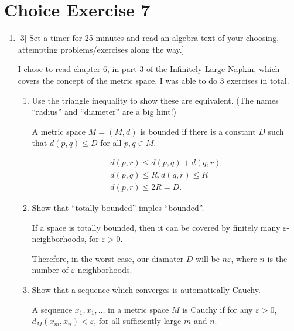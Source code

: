 \documentclass{article}
\begin{document}
\section*{Choice Exercise 7}
\begin{enumerate}
    \item {
        [3] Set a timer for 25 minutes and read an algebra text of your choosing, attempting problems/exercises along the way.]

        I chose to read chapter 6, in part 3 of the Infinitely Large Napkin, which
        covers the concept of the metric space. I was able to do 3 exercises 
        in total. 

        \begin{enumerate}
            \item[Exercise 6.1.3. ] {
                Use the triangle inequality to show these are equivalent. (The names “radius” and “diameter” are a big hint!)

                A metric space \(M = (M, d)\) is bounded if there is a constant 
                \(D\) such that \(d(p, q) \le D\) for all \(p, q \in M\).

                \begin{align}
                    d(p,r) \le d(p,q) + d(q,r) \\
                    d(p,q) \le R, d(q,r) \le R \\
                    d(p,r) \le 2R = D.
                \end{align}
            }

            \item[Exercise 6.1.6.] {
                Show that ``totally bounded'' imples ``bounded''.

                If a space is totally bounded, then it can be covered by finitely 
                many \(\varepsilon\)-neighborhoods, for \(\varepsilon > 0\).

                Therefore, in the worst case, our diamater \(D\) will be \(n\varepsilon\), 
                where \(n\) is the number of \(\varepsilon\)-neighborhoods.
            }
            \item[Question 6.2.2.] {
                Show that a sequence which converges is automatically Cauchy.

                A sequence \(x_1,x_1, \dots\) in a metric space \(M\) is Cauchy 
                if for any \(\varepsilon > 0\), \(d_M(x_m, x_n) < \varepsilon\), 
                for all sufficiently large \(m\) and \(n\).

}
\end{enumerate}}
\end{enumerate}
\end{document}
